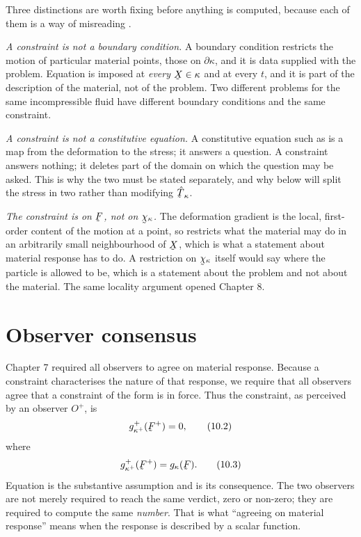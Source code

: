 \begin{remark}\label{rem:ch10what}
Three distinctions are worth fixing before anything is computed, because
each of them is a way of misreading .

\emph{A constraint is not a boundary condition.} A boundary condition
restricts the motion of particular material points, those on
$\partial\kappa$, and it is data supplied with the problem. Equation
 is imposed at \emph{every} $\bX\in\kappa$ and at every $t$,
and it is part of the description of the material, not of the problem.
Two different problems for the same incompressible fluid have different
boundary conditions and the same constraint.

\emph{A constraint is not a constitutive equation.} A constitutive
equation such as  is a map from the deformation to the stress;
it answers a question. A constraint answers nothing; it deletes part of
the domain on which the question may be asked. This is why the two must
be stated separately, and why  below will split the stress in
two rather than modifying $\hat\bT_{\kappa}$.

\emph{The constraint is on $\bF$, not on $\bchi_{\kappa}$.} The
deformation gradient is the local, first-order content of the motion at
a point, so  restricts what the material may do in an
arbitrarily small neighbourhood of $\bX$, which is what a statement about
material response has to do. A restriction on $\bchi_{\kappa}$ itself
would say where the particle is allowed to be, which is a statement about
the problem and not about the material. The same locality argument opened
Chapter 8.
\end{remark}

\section{Observer consensus}\label{sec:ch10obs}

Chapter 7 required all observers to agree on material response. Because a
constraint characterises the nature of that response, we require that all
observers agree that a constraint of the form  is in force.
Thus the constraint, as perceived by an observer $O^{+}$, is
\begin{equation}
   g^{+}_{\kappa^{+}}(\bF^{+})=0 ,
   \tag{10.2}\label{eq:10.2}
\end{equation}
where
\begin{equation}
   g^{+}_{\kappa^{+}}(\bF^{+})=g_{\kappa}(\bF).
   \tag{10.3}\label{eq:10.3}
\end{equation}
Equation  is the substantive assumption and  is its
consequence. The two observers are not merely required to reach the same
verdict, zero or non-zero; they are required to compute the same
\emph{number}. That is what ``agreeing on material response'' means when
the response is described by a scalar function.

